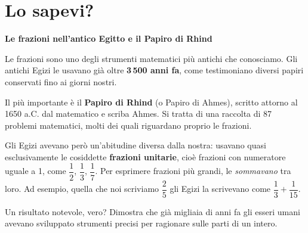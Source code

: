 \section*{Lo sapevi?}

\begin{sapevi}
    \textbf{Le frazioni nell'antico Egitto e il Papiro di Rhind}

    Le frazioni sono uno degli strumenti matematici più antichi che conosciamo.
    Gli antichi Egizi le usavano già oltre \textbf{3\,500 anni fa}, come testimoniano
    diversi papiri conservati fino ai giorni nostri.

    Il più importante è il \textbf{Papiro di Rhind} (o Papiro di Ahmes),
    scritto attorno al 1650 a.C. dal matematico e scriba Ahmes.
    Si tratta di una raccolta di 87 problemi matematici, molti dei quali riguardano
    proprio le frazioni.

    Gli Egizi avevano però un'abitudine diversa dalla nostra: usavano quasi
    esclusivamente le cosiddette \textbf{frazioni unitarie}, cioè frazioni con
    numeratore uguale a 1, come $\dfrac{1}{2}$, $\dfrac{1}{3}$, $\dfrac{1}{7}$.
    Per esprimere frazioni più grandi, le \emph{sommavano} tra loro.
    Ad esempio, quella che noi scriviamo $\dfrac{2}{5}$ gli Egizi la scrivevano come
    $\dfrac{1}{3} + \dfrac{1}{15}$.

    Un risultato notevole, vero? Dimostra che già migliaia di anni fa gli esseri umani
    avevano sviluppato strumenti precisi per ragionare sulle parti di un intero.
\end{sapevi}

